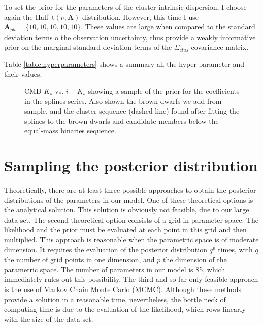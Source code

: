 To set the prior for the parameters of the cluster intrinsic dispersion, I choose again the Half--t$(\nu,\boldsymbol{A})$ distribution.  However, this time I use  $\boldsymbol{A}_{ph}=\{10,10,10,10,10\}$. These values are large when compared to the standard deviation terms o the observation uncertainty, thus provide a weakly informative prior on the marginal standard deviation terms of the $\Sigma_{clus}$ covariance matrix.

Table \ref{table:hyperparameters} shows a summary all the hyper-parameter and their values.

%

\begin{figure}[htbp]
\begin{center}
\caption{CMD $K_s$ vs. $i-K_s$ showing a sample of the prior for the coefficients in the splines series. Also shown the brown-dwarfs we add from \citet{Faherty2012} sample, and the cluster sequence (dashed line) found after fitting the splines to the brown-dwarfs and candidate members below the equal-mass binaries sequence.}
\label{figure:priorcoefs}
\end{center}
\end{figure}

%

\section{Sampling the posterior distribution}
Theoretically, there are at least three possible approaches to obtain the posterior distributions of the parameters in our model. One of these theoretical options is the analytical solution. This solution is obviously not feasible, due to our large data set. The second theoretical option consists of a grid in parameter space. The likelihood and the prior must be evaluated at each point in this grid and then multiplied. This approach is reasonable when the parametric space is of moderate dimension. It requires the evaluation of the posterior distribution $q^p$ times, with $q$ the number of grid points in one dimension, and $p$ the dimension of the parametric space. The number of parameters in our model is 85, which immediately rules out this possibility. The third and so far only feasible approach is the use of Markov Chain Monte Carlo (MCMC). Although these methods provide a solution in a reasonable time, nevertheless, the bottle neck of computing time is due to the evaluation of the likelihood, which rows linearly with the size of the data set. 

